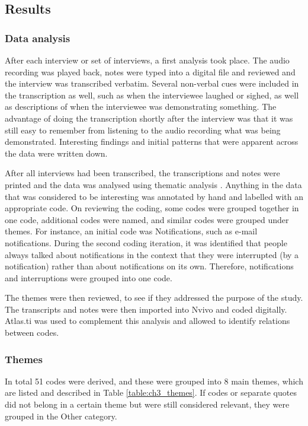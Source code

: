 \subsection{Results}
\subsubsection{Data analysis}
After each interview or set of interviews, a first analysis took place. The audio recording was played back, notes were typed into a digital file and reviewed and the interview was transcribed verbatim. Several non-verbal cues were included in the transcription as well, such as when the interviewee laughed or sighed, as well as descriptions of when the interviewee was demonstrating something. The advantage of doing the transcription shortly after the interview was that it was still easy to remember from listening to the audio recording what was being demonstrated. Interesting findings and initial patterns that were apparent across the data were written down. 

After all interviews had been transcribed, the transcriptions and notes were printed and the data was analysed using thematic analysis \citep{Braun2006}. Anything in the data that was considered to be interesting was annotated by hand and labelled with an appropriate code. On reviewing the coding, some codes were grouped together in one code, additional codes were named, and similar codes were grouped under themes. For instance, an initial code was Notifications, such as e-mail notifications. During the second coding iteration, it was identified that people always talked about notifications in the context that they were interrupted (by a notification) rather than about notifications on its own. Therefore, notifications and interruptions were grouped into one code. 

The themes were then reviewed, to see if they addressed the purpose of the study. The transcripts and notes were then imported into Nvivo and coded digitally. Atlas.ti was used to complement this analysis and allowed to identify relations between codes. 

\subsubsection{Themes}
In total 51 codes were derived, and these were grouped into 8 main themes, which are listed and described in Table \ref{table:ch3_themes}. If codes or separate quotes did not belong in a certain theme but were still considered relevant, they were grouped in the Other category. 

